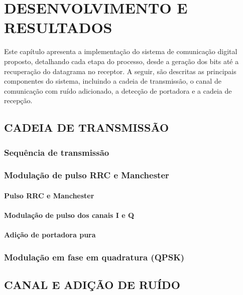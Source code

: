 \chapter{DESENVOLVIMENTO E RESULTADOS}\label{cap:desenvolvimento}

Este capítulo apresenta a implementação do sistema de comunicação digital proposto, detalhando cada etapa do processo, desde a geração dos bits até a recuperação do datagrama no receptor. A seguir, são descritas as principais componentes do sistema, incluindo a cadeia de transmissão, o canal de comunicação com ruído adicionado, a detecção de portadora e a cadeia de recepção.

\section{CADEIA DE TRANSMISSÃO}\label{sec:transmissao}

\subsection{Sequência de transmissão}\label{sec:geracao_bits}

\subsection{Modulação de pulso RRC e Manchester}

\subsubsection{Pulso RRC e Manchester}

\subsubsection{Modulação de pulso dos canais I e Q}

\subsubsection{Adição de portadora pura}

\subsection{Modulação em fase em quadratura (QPSK)}\label{sec:qpsk}

\section{CANAL E ADIÇÃO DE RUÍDO}\label{sec:canal}

